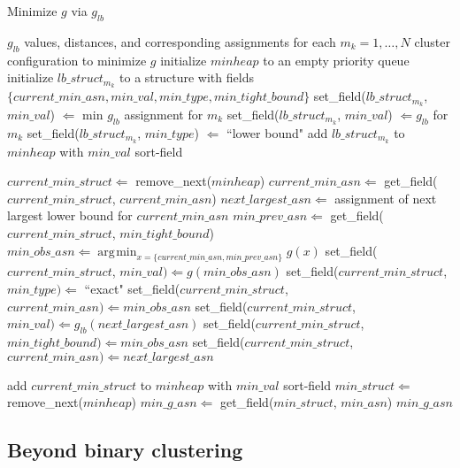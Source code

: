 \documentclass{article}
\numberwithin{equation}{section}
\numberwithin{thm}{section}
\DeclareMathOperator*{\argmin}{\arg\!\min}
\begin{document}
\begin{algorithm}                     			
\caption{Minimize $g$ via $g_{lb}$}
\label{alg1}                           
\begin{algorithmic} 
    \Require $g_{lb}$ values, distances, and corresponding assignments for each $m_k=1,\ldots,N$
    \Ensure cluster configuration to minimize $g$
        \State initialize $minheap$ to an empty priority queue  
    \State initialize $lb\_struct_{m_k}$ to a structure with fields $\{ current\_min\_asn, min\_val, min\_type, min\_tight\_bound \}$
    \State set\_field($lb\_struct_{m_k}$, $min\_val$) $\Leftarrow$ min $g_{lb}$ assignment for $m_k$
    \State set\_field($lb\_struct_{m_k}$, $min\_val$) $\Leftarrow g_{lb}$ for $m_k$
    \State set\_field($lb\_struct_{m_k}$, $min\_type$) $\Leftarrow$ ``lower bound"
    \State add $lb\_struct_{m_k}$ to $minheap$ with $min\_val$ sort-field 
    \EndFor      
    
    	\State $current\_min\_struct \Leftarrow$ remove\_next($minheap$)
	\State $current\_min\_asn \Leftarrow$ get\_field($current\_min\_struct$, $current\_min\_asn$)
	\State $next\_largest\_asn \Leftarrow $ assignment of next largest lower bound for $current\_min\_asn$
	\State $min\_prev\_asn \Leftarrow$ get\_field($current\_min\_struct$, $min\_tight\_bound$)
	\State $min\_obs\_asn \Leftarrow \argmin_{x = \{current\_min\_asn, min\_prev\_asn\}} g(x)$ 
		\State set\_field($current\_min\_struct$, $min\_val) \Leftarrow g(min\_obs\_asn)$
		\State set\_field($current\_min\_struct$, $min\_type) \Leftarrow$ ``exact"
		\State set\_field($current\_min\_struct$, $current\_min\_asn) \Leftarrow min\_obs\_asn$
	\Else 
		\State set\_field($current\_min\_struct$, $min\_val) \Leftarrow g_{lb}(next\_largest\_asn)$
		\State set\_field($current\_min\_struct$, $min\_tight\_bound) \Leftarrow min\_obs\_asn$
		\State set\_field($current\_min\_struct$, $current\_min\_asn) \Leftarrow next\_largest\_asn$
	\EndIf

	\State add $current\_min\_struct$ to $minheap$ with $min\_val$ sort-field 
    \EndWhile
    \State $min\_struct \Leftarrow$ remove\_next($minheap$)
  \State $min\_g\_asn \Leftarrow$ get\_field($min\_struct$, $min\_asn$)
    \State \Return $min\_g\_asn$
\end{algorithmic}
\end{algorithm}

\subsection{Beyond binary clustering}
\end{document}
